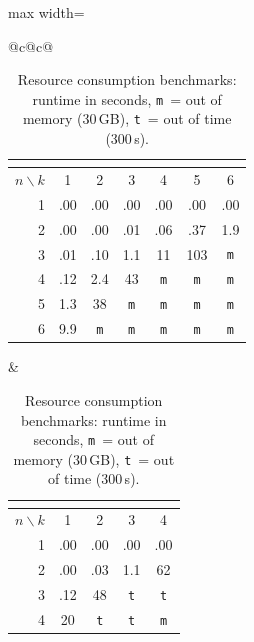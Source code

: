 \documentclass[10pt]{article}
\newcommand{\ValFunction}[1]{{\textsf{#1}}\xspace}
\newcommand{\Max}{\ValFunction{Max}}
\newcommand{\Sup}{\ValFunction{Sup}}
\newcommand{\LimSupAvg}{\ValFunction{LimSupAvg}}
\newcommand{\oom}{\texttt{m}}
\newcommand{\oot}{\texttt{t}}
\begin{document}
\begin{table}[t]
	\centering
	\begin{adjustbox}{max width=\linewidth}
		\scriptsize
		\setlength{\tabcolsep}{2pt}
		\renewcommand{\arraystretch}{1.05}
		\begin{tabular}{@{}c@{\qquad}c@{}}
			\begin{tabular}[t]{@{}r*{6}{c}@{}}
				\multicolumn{7}{c}{\makebox[0pt]{(a) (\Sup,\Max) emptiness}}\\[2pt]
				\toprule
				$n\backslash k$ & 1 & 2 & 3 & 4 & 5 & 6 \\
				\midrule
				1 & .00 & .00 & .00 & .00 & .00 & .00 \\
				2 & .00 & .00 & .01 & .06 & .37 & 1.9 \\
				3 & .01 & .10 & 1.1 & 11 & 103 & \oom \\
				4 & .12 & 2.4 & 43 & \oom & \oom & \oom \\
				5 & 1.3 & 38 & \oom & \oom & \oom & \oom \\
				6 & 9.9 & \oom & \oom & \oom & \oom & \oom \\
				\bottomrule
			\end{tabular}
			&\hspace{4em}
			\begin{tabular}[t]{@{}r*{4}{c}@{}}
				\multicolumn{5}{c}{\makebox[0pt]{(b) (\LimSupAvg,\Max) emptiness}}\\[2pt]
				\toprule
				$n\backslash k$ & 1 & 2 & 3 & 4 \\
				\midrule
				1 & .00 & .00 & .00 & .00 \\
				2 & .00 & .03 & 1.1 & 62 \\
				3 & .12 & 48 & \oot & \oot \\
				4 & 20 & \oot & \oot & \oom \\
				\bottomrule
			\end{tabular}
		\end{tabular}
	\end{adjustbox}
	\vspace{0.25em}
	\caption{Resource consumption benchmarks: runtime in seconds, \oom~= out of memory (30\,GB), \oot~= out of time (300\,s). \vspace{-2.5em}}
	\label{fig:resource_consumption_benchmarks}
\end{table}
\end{document}
